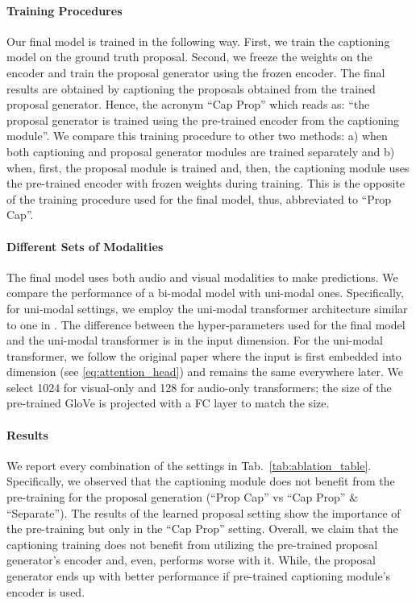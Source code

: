 \documentclass{src/bmvc2k}
\begin{document}
\paragraph{Training Procedures}
Our final model is trained in the following way. First, we train the captioning model on the ground truth proposal. Second, we freeze the weights on the encoder and train the proposal generator using the frozen encoder. The final results are obtained by captioning the proposals obtained from the trained proposal generator. Hence, the acronym ``Cap  Prop'' which reads as: ``the proposal generator is trained using the pre-trained encoder from the captioning module''. We compare this training procedure to other two methods: a) when both captioning and proposal generator modules are trained separately and b) when, first, the proposal module is trained and, then, the captioning module uses the pre-trained encoder with frozen weights during training. This is the opposite of the training procedure used for the final model, thus, abbreviated to ``Prop  Cap''.\vspace{-2ex}

\paragraph{Different Sets of Modalities}
The final model uses both audio and visual modalities to make predictions. We compare the performance of a bi-modal model with uni-modal ones. Specifically, for uni-modal settings, we employ the uni-modal transformer architecture similar to one in \cite{mdvc_Iashin_2020}. The difference between the hyper-parameters used for the final model and the uni-modal transformer is in the input dimension. For the uni-modal transformer, we follow the original paper where the input is first embedded into  dimension (see \eqref{eq:attention_head}) and remains the same everywhere later. We select 1024 for visual-only and 128 for audio-only transformers; the size of the pre-trained GloVe is projected with a FC layer to match the size. \vspace{-4ex}

\paragraph{Results}
We report every combination of the settings in Tab.~\ref{tab:ablation_table}. Specifically, we observed that the captioning module does not benefit from the pre-training for the proposal generation (``Prop  Cap'' vs ``Cap  Prop'' \& ``Separate''). The results of the learned proposal setting show the importance of the pre-training but only in the ``Cap  Prop'' setting. Overall, we claim that the captioning training does not benefit from utilizing the pre-trained proposal generator's encoder and, even, performs worse with it. While, the proposal generator ends up with better performance if pre-trained captioning module's encoder is used.
\end{document}
